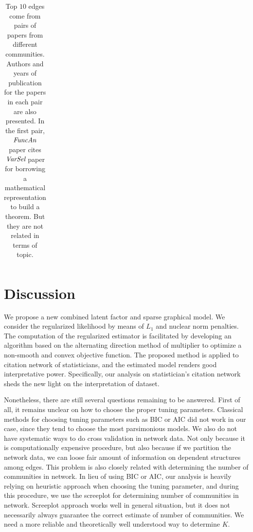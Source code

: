 \documentclass[AMS,STIX1COL]{WileyNJD-v2}
\begin{document}
{\begin{table}[htbp]
\begin{tabular}{ccccc}
\\ \hline
\end{tabular}
\caption{Top $10$ edges come from pairs of papers from different communities.
Authors and years of publication for the papers in each pair are also presented.
In the first pair, $\emph{FuncAn}$ paper cites $\emph{VarSel}$ paper for borrowing a mathematical representation to build a theorem.
But they are not related in terms of topic.}
\label{tab:table2}
\end{table}

\section{Discussion}
\label{sec:Con}

We propose a new combined latent factor and sparse graphical model.
We consider the regularized likelihood by means of $L_1$ and nuclear norm penalties.
The computation of the regularized estimator is facilitated by developing an algorithm based on the alternating direction method of multiplier to optimize a non-smooth and convex objective function.
The proposed method is applied to citation network of statisticians, and the estimated model renders good interpretative power.
Specifically, our analysis on statistician's citation network sheds the new light on the interpretation of dataset.

Nonetheless, there are still several questions remaining to be answered.
First of all, it remains unclear on how to choose the proper tuning parameters.
Classical methods for choosing tuning parameters such as BIC or AIC did not work in our case, since they tend to choose the most parsimonious models.
We also do not have systematic ways to do cross validation in network data.
Not only because it is computationally expensive procedure, but also because if we partition the network data, we can loose fair amount of information on dependent structures among edges.
This problem is also closely related with determining the number of communities in network.
In lieu of using BIC or AIC, our analysis is heavily relying on heuristic approach when choosing the tuning parameter, and during this procedure, we use the screeplot for determining number of communities in network.
Screeplot approach works well in general situation, but it does not necessarily always guarantee the correct estimate of number of communities.
We need a more reliable and theoretically well understood way to determine $K$.

}
\end{document}
